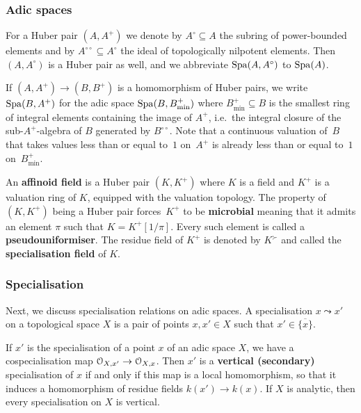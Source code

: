 \subsubsection*{Adic spaces}

For a Huber pair $(A, A^+)$ we denote by $A^\circ\subseteq A$ the subring of power-bounded elements and by $A^{\circ\circ}\subseteq A^\circ$ the ideal of topologically nilpotent elements. Then $(A, A^\circ)$ is a Huber pair as well, and we abbreviate $\operatorname{Spa}(A, A^\circ)$ to $\operatorname{Spa}(A)$.

If $(A, A^+)\to (B, B^+)$ is a homomorphism of Huber pairs, we write $\operatorname{Spa}(B, A^+)$ for the adic space $\operatorname{Spa}(B, B^+_{\min})$ where $B^+_{\min}\subseteq B$ is the smallest ring of integral elements containing the image of $A^+$, i.e.\ the integral closure of the sub-$A^+$-algebra of $B$ generated by $B^{\circ\circ}$.
Note that a continuous valuation of~$B$ that takes values less than or equal to~$1$ on~$A^+$ is already less than or equal to~$1$ on~$B^+_{\min}$.

An {\bf affinoid field} is a Huber pair $(K, K^+)$ where $K$ is a field and $K^+$ is a valuation ring of $K$, equipped with the valuation topology.
The property of $(K,K^+)$ being a Huber pair forces~$K^+$ to be {\bf microbial} meaning that it admits an element $\pi$ such that $K = K^+[1/\pi]$.
Every such element is called a {\bf pseudouniformiser}.
The residue field of $K^+$ is denoted by $K^\succ$ and called the {\bf specialisation field} of $K$. 

\subsubsection*{Specialisation}

Next, we discuss specialisation relations on adic spaces. A specialisation $x\leadsto x'$ on a topological space $X$ is a pair of points $x,x'\in X$ such that $x'\in\overline{\{x\}}$. 

If $x'$ is the specialisation of a point $x$ of an adic space $X$, we have a cospecialisation map ${\mathcal O}_{X,x'}\to {\mathcal O}_{X,x}$.
Then $x'$ is a \textbf{vertical (secondary)} specialisation of $x$ if and only if this map is a local homomorphism, so that it induces a homomorphism of residue fields $k(x')\to k(x)$. 
If $X$ is analytic, then every specialisation on $X$ is vertical. 

